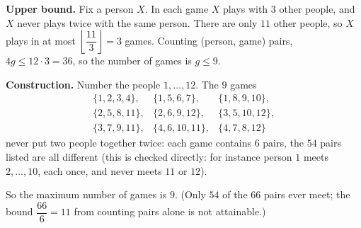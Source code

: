 \textbf{Upper bound.} Fix a person $X$. In each game $X$ plays with $3$ other people, and $X$ never plays twice with the same person. There are only $11$ other people, so $X$ plays in at most $\left\lfloor\dfrac{11}{3}\right\rfloor=3$ games. Counting (person, game) pairs, $4g\le12\cdot3=36$, so the number of games is $g\le9$.

\textbf{Construction.} Number the people $1,\dots,12$. The $9$ games
\[
\begin{array}{lll}
\{1,2,3,4\}, & \{1,5,6,7\}, & \{1,8,9,10\},\\
\{2,5,8,11\}, & \{2,6,9,12\}, & \{3,5,10,12\},\\
\{3,7,9,11\}, & \{4,6,10,11\}, & \{4,7,8,12\}
\end{array}
\]
never put two people together twice: each game contains $6$ pairs, the $54$ pairs listed are all different (this is checked directly: for instance person $1$ meets $2,\dots,10$, each once, and never meets $11$ or $12$).

So the maximum number of games is $\boxed{9}$. (Only $54$ of the $66$ pairs ever meet; the bound $\dfrac{66}{6}=11$ from counting pairs alone is not attainable.)
